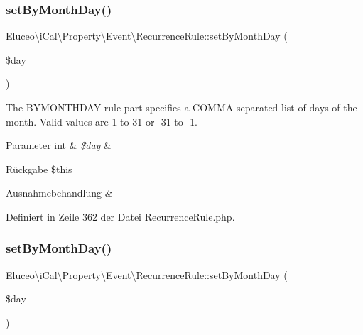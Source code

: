 \subsubsection{\texorpdfstring{set\+By\+Month\+Day()}{setByMonthDay()}\hspace{0.1cm}{\footnotesize\ttfamily [2/3]}}
{\footnotesize\ttfamily Eluceo\textbackslash{}i\+Cal\textbackslash{}\+Property\textbackslash{}\+Event\textbackslash{}\+Recurrence\+Rule\+::set\+By\+Month\+Day (\begin{DoxyParamCaption}\item[{}]{\$day }\end{DoxyParamCaption})}

The B\+Y\+M\+O\+N\+T\+H\+D\+AY rule part specifies a C\+O\+M\+M\+A-\/separated list of days of the month. Valid values are 1 to 31 or -\/31 to -\/1.


\begin{DoxyParams}[1]{Parameter}
int & {\em \$day} & \\
\hline
\end{DoxyParams}
\begin{DoxyReturn}{Rückgabe}
\$this
\end{DoxyReturn}

\begin{DoxyExceptions}{Ausnahmebehandlung}
{\em } & \\
\hline
\end{DoxyExceptions}


Definiert in Zeile 362 der Datei Recurrence\+Rule.\+php.

\mbox{\label{class_eluceo_1_1i_cal_1_1_property_1_1_event_1_1_recurrence_rule_a51cb3376640302adb54a73919d863f70}} 
\subsubsection{\texorpdfstring{set\+By\+Month\+Day()}{setByMonthDay()}\hspace{0.1cm}{\footnotesize\ttfamily [3/3]}}
{\footnotesize\ttfamily Eluceo\textbackslash{}i\+Cal\textbackslash{}\+Property\textbackslash{}\+Event\textbackslash{}\+Recurrence\+Rule\+::set\+By\+Month\+Day (\begin{DoxyParamCaption}\item[{}]{\$day }\end{DoxyParamCaption})}

